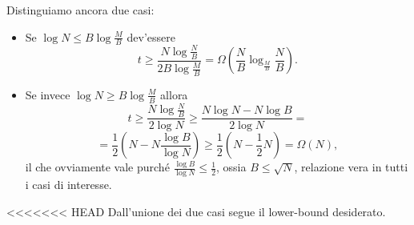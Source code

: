 Distinguiamo ancora due casi:
\begin{itemize}
\item Se $\log N \le B \log\frac{M}{B}$ dev'essere \[\displaystyle t \ge \frac{N \log \frac{N}{B}}{2B\log\frac{M}{B}}=\Omega\left(\frac{N}{B}\log_{\frac{M}{B}}\frac{N}{B}\right).\]
\item Se invece $\log N \ge B\log\frac{M}{B}$ allora \[t\ge\frac{N\log\frac{N}{B}}{2\log N}\ge\frac{N\log N - N\log B}{2\log N} =\]\[= \frac12\left(N-N\frac{\log B}{\log N}\right)\ge\frac12(N-\frac12 N)=\Omega(N),\]il che ovviamente vale purché $\displaystyle\frac{\log B}{\log N}\le\frac12$, ossia $B\le \sqrt{N}$, relazione vera in tutti i casi di interesse.
\end{itemize}
<<<<<<< HEAD
Dall'unione dei due casi segue il lower-bound desiderato.  
